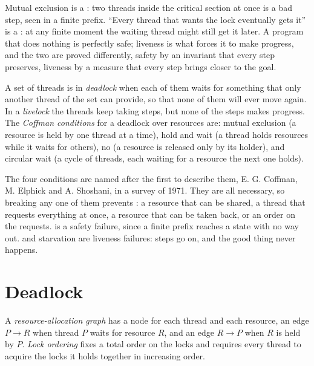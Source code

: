 Mutual exclusion is a : two threads inside the critical section at once is a bad step, seen in a finite prefix. ``Every thread that wants the lock eventually gets it'' is a : at any finite moment the waiting thread might still get it later. A program that does nothing is perfectly safe; liveness is what forces it to make progress, and the two are proved differently, safety by an invariant that every step preserves, liveness by a measure that every step brings closer to the goal.

\begin{definition}\label{def:b3:concurrency:deadlock}
A set of threads is in \emph{deadlock} when each of them waits for something that only another thread of the set can provide, so that none of them will ever move again. In a \emph{livelock} the threads keep taking steps, but none of the steps makes progress. The \emph{Coffman conditions} for a deadlock over resources are: mutual exclusion (a resource is held by one thread at a time), hold and wait (a thread holds resources while it waits for others), no  (a resource is released only by its holder), and circular wait (a cycle of threads, each waiting for a resource the next one holds).
\end{definition}

The four conditions are named after the first to describe them, E. G. Coffman, M. Elphick and A. Shoshani, in a survey of 1971. %
They are all necessary, so breaking any one of them prevents : a resource that can be shared, a thread that requests everything at once, a resource that can be taken back, or an order on the requests.  is a safety failure, since a finite prefix reaches a state with no way out.  and starvation are liveness failures: steps go on, and the good thing never happens.

\section{Deadlock}\label{sec:b3:concurrency:deadlock}

\begin{definition}\label{def:b3:concurrency:rag}
A \emph{resource-allocation graph} has a node for each thread and each resource, an edge $P \to R$ when thread $P$ waits for resource $R$, and an edge $R \to P$ when $R$ is held by $P$. \emph{Lock ordering} fixes a total order on the locks and requires every thread to acquire the locks it holds together in increasing order.
\end{definition}


